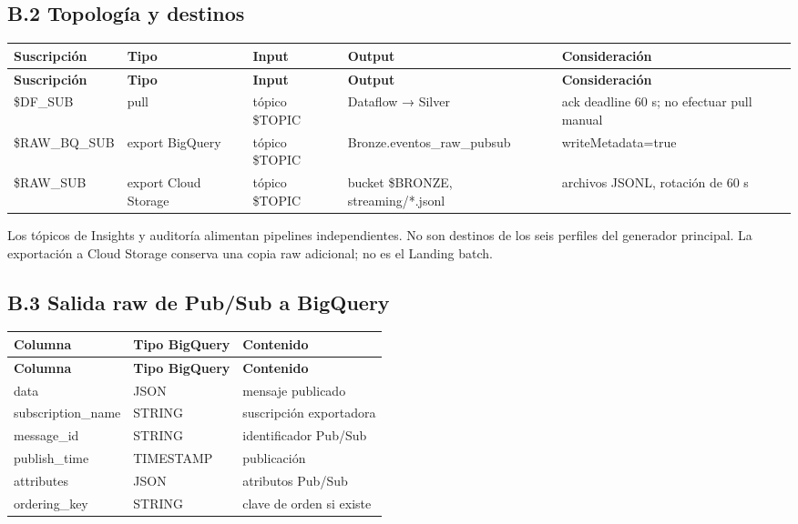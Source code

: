 \documentclass[11pt]{article}
\begin{document}
\subsection{B.2 Topología y destinos}

\begingroup\small
\begin{longtable}{@{}>{\raggedright\arraybackslash}p{}>{\raggedright\arraybackslash}p{}>{\raggedright\arraybackslash}p{}>{\raggedright\arraybackslash}p{}>{\raggedright\arraybackslash}p{}@{}}
\toprule
\textbf{Suscripción} & \textbf{Tipo} & \textbf{Input} & \textbf{Output} & \textbf{Consideración} \\
\midrule
\endfirsthead
\toprule
\textbf{Suscripción} & \textbf{Tipo} & \textbf{Input} & \textbf{Output} & \textbf{Consideración} \\
\midrule
\endhead
\$DF\_\allowbreak{}SUB & pull & tópico \$TOPIC & Dataflow → Silver & ack deadline 60 s; no efectuar pull manual \\
\$RAW\_\allowbreak{}BQ\_\allowbreak{}SUB & export BigQuery & tópico \$TOPIC & Bronze.eventos\_\allowbreak{}raw\_\allowbreak{}pubsub & writeMetadata=\allowbreak{}true \\
\$RAW\_\allowbreak{}SUB & export Cloud Storage & tópico \$TOPIC & bucket \$BRONZE, streaming/*.jsonl & archivos JSONL, rotación de 60 s \\
\bottomrule
\end{longtable}
\endgroup

Los tópicos de Insights y auditoría alimentan pipelines independientes. No son destinos de los seis perfiles del generador principal. La exportación a Cloud Storage conserva una copia raw adicional; no es el Landing batch.\par

\subsection{B.3 Salida raw de Pub/\allowbreak{}Sub a BigQuery}

\begingroup\small
\begin{longtable}{@{}>{\raggedright\arraybackslash}p{}>{\raggedright\arraybackslash}p{}>{\raggedright\arraybackslash}p{}@{}}
\toprule
\textbf{Columna} & \textbf{Tipo BigQuery} & \textbf{Contenido} \\
\midrule
\endfirsthead
\toprule
\textbf{Columna} & \textbf{Tipo BigQuery} & \textbf{Contenido} \\
\midrule
\endhead
data & JSON & mensaje publicado \\
subscription\_\allowbreak{}name & STRING & suscripción exportadora \\
message\_\allowbreak{}id & STRING & identificador Pub/\allowbreak{}Sub \\
publish\_\allowbreak{}time & TIMESTAMP & publicación \\
attributes & JSON & atributos Pub/\allowbreak{}Sub \\
ordering\_\allowbreak{}key & STRING & clave de orden si existe \\
\bottomrule
\end{longtable}
\endgroup
\end{document}

